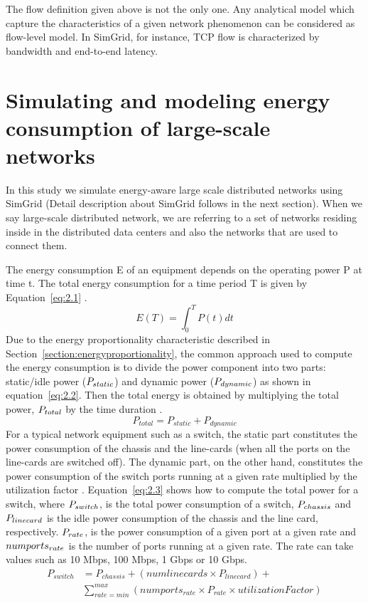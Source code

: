 The flow definition given above is not the only one. Any analytical model which capture the characteristics of a given network phenomenon can be considered as flow-level model. In SimGrid, for instance, TCP flow is characterized by bandwidth and end-to-end latency\cite{DBLP:journals/jpdc/CasanovaGLQS14}.
\section{Simulating and modeling energy consumption of large-scale networks}

In this study we simulate energy-aware large scale distributed networks using SimGrid (Detail description about SimGrid follows in the next section). When we say large-scale distributed network, we are referring to a set of networks residing inside in the distributed data centers and also the networks that are used to connect them. 

The energy consumption E of an equipment depends on the operating power P at time t. The total energy consumption for a time period T is given by Equation~\ref{eq:2.1} \cite{DBLP:conf/wowmom/OrgerieLLL11}. 
\begin{equation} \label{eq:2.1}
  E(T) = \int_{0}^{T} P(t) dt
\end{equation} 
Due to the energy proportionality characteristic described in Section~\ref{section:energyproportionality}, the common approach used to compute the energy consumption is to divide the power component into two parts: static/idle power (\($$P_{static}$$\)) and dynamic power (\($$P_{dynamic}$$\)) as shown in equation~\ref{eq:2.2}. Then the total energy is obtained by multiplying the total power, \($$P_{total}$$\) by the time duration \cite{DBLP:conf/wowmom/OrgerieLLL11,DBLP:journals/tjs/KliazovichBK12,DBLP:conf/networking/MahadevanSBR09,DBLP:journals/comsur/DayarathnaWF16}. 
\begin{equation} \label{eq:2.2}
 P_{total} = P_{static} + P_{dynamic}
\end{equation} 
For a typical network equipment such as a switch, the static part constitutes the power consumption of the chassis and the line-cards (when all the ports on the line-cards are switched off). The dynamic part, on the other hand, constitutes the power consumption of the switch ports running at a given rate multiplied by the utilization factor \cite{DBLP:conf/networking/MahadevanSBR09}. Equation~\ref{eq:2.3} shows how to compute the total power for a switch, where \($$P_{switch}$$\), is the total power consumption of a switch, \($$P_{chassis}$$\) and \($$P_{linecard}$$\) is the idle power consumption of the chassis and the line card, respectively. \($$P_{rate}$$\), is the power consumption of a given port at a given rate and \($$numports_{rate}$$\) is the number of ports running at a given rate. The rate can take values such as 10 Mbps, 100 Mbps, 1 Gbps or 10 Gbps.
\begin{equation} \label{eq:2.3}
\begin{split}
P_{switch} &= P_{chassis} + (numlinecards \times P_{linecard})  + \\
&\sum_{rate=min}^{max} (numports_{rate} \times P_{rate} \times utilizationFactor)
\end{split}
\end{equation}
